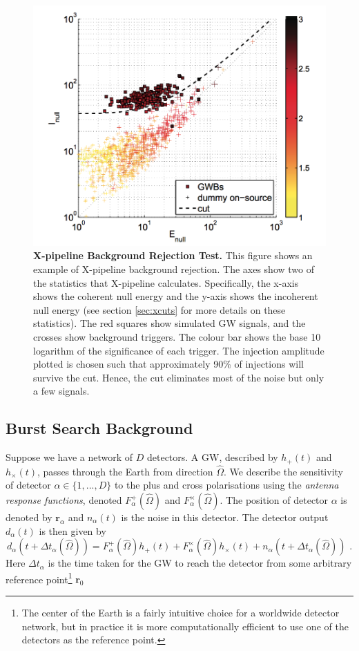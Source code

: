 \documentclass[11pt]{cuthesis}
\newcommand{\fs}{\text{ .}}
\newcommand{\Fp}{F^{+}_{\alpha}}
\newcommand{\Fx}{F^{\times}_{\alpha}}
\newcommand{\xp}{X-pipeline }
\begin{document}
\begin{figure} %
\begin{center}
\includegraphics[width=0.8\linewidth]{xpipeline_cut.png}
\end{center}
\caption{ \textbf{\xp Background Rejection Test.} This figure shows an example of \xp background rejection. The axes show two of the statistics that \xp calculates. Specifically, the x-axis shows the coherent null energy and the y-axis shows the incoherent null energy (see section \ref{sec:xcuts} for more details on these statistics). The red squares show simulated GW signals, and the crosses show background triggers. The colour bar shows the base 10 logarithm of the significance of each trigger. The injection amplitude plotted is chosen such that approximately 90\% of injections will survive the cut. Hence, the cut eliminates most of the noise but only a few signals. \cite{xpipeline}  }
\label{fig:xcuts}
\end{figure}

\subsection{Burst Search Background}
Suppose we have a network of $D$ detectors. A GW, described by $h_+(t)$ and $h_\times (t)$, passes through the Earth from direction $\hat{\Omega}$. We describe the sensitivity of detector $\alpha \in \{1,...,D \}$ to the plus and cross polarisations using the \emph{antenna response functions}, denoted $\Fp (\hat{\Omega})$ and $\Fx(\hat{\Omega})$. The position of detector $\alpha$ is denoted by $\textbf{r}_\alpha$ and $n_\alpha (t)$ is the noise in this detector. The detector output $d_\alpha (t)$ is then given by
\begin{equation} \label{det_output}
d_\alpha (t + \Delta t_\alpha (\hat{\Omega})) = \Fp (\hat{\Omega}) h_+ (t) + \Fx (\hat{\Omega}) h_\times (t) + n_\alpha (t + \Delta t_\alpha (\hat{\Omega})) \fs
\end{equation}   
Here $\Delta t_\alpha$ is the time taken for the GW to reach the detector from some arbitrary reference point\footnote{The center of the Earth is a fairly intuitive choice for a worldwide detector network, but in practice it is more computationally efficient to use one of the detectors as the reference point.} $\textbf{r}_0$
\end{document}
